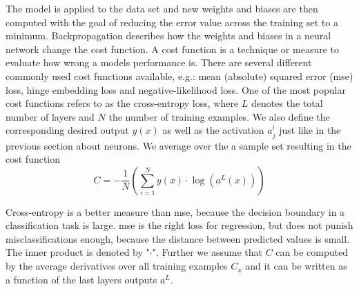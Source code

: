 The model is applied to the data set and new weights and biases are then computed with the goal of reducing the error value across the training set to a minimum. Backpropagation describes how the weights and biases in a neural network change the cost function. A cost function is a technique or measure to evaluate how wrong a models performance is. There are several different commonly used cost functions available, e.g.: mean (absolute) squared error (\acrshort{mse}) loss, hinge embedding loss and negative-likelihood loss. One of the most popular cost functions refers to as the cross-entropy loss, where \( L \) denotes the total number of layers and \( N \) the number of training examples. We also define the corresponding desired output \( y(x) \) as well as the activation \( a^l_j \) just like in the previous section about neurons. We average over the a sample set resulting in the cost function
\begin{equation}
    C = - \frac{1}{N} \left( \sum_{i=1}^N y(x) \cdot \log(a^L(x)) \right)
    \label{eq:crossentropy}
\end{equation}

Cross-entropy is a better measure than \acrshort{mse}, because the decision boundary in a classification task is large. \Acrshort{mse} is the right loss for \gls{regression}, but does not punish misclassifications enough, because the distance between predicted values is small. The inner product is denoted by "\( \cdot \)". Further we assume that \( C \) can be computed by the average derivatives over all training examples \( C_x \) and it can be written as a function of the last layers outputs \( a^L \). \cite{Nielsen.2015} \cite{Dreyfus.1990}

